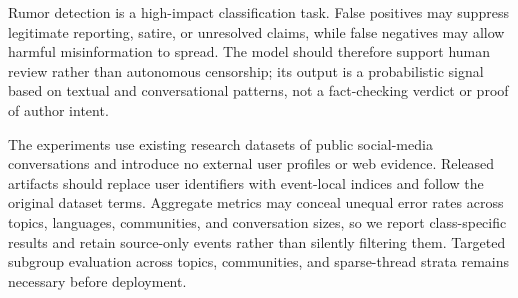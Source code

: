 \documentclass[sigconf,anonymous,review]{../acmart/acmart}
\begin{document}
Rumor detection is a high-impact classification task.  False positives may
suppress legitimate reporting, satire, or unresolved claims, while false
negatives may allow harmful misinformation to spread.  The model should
therefore support human review rather than autonomous censorship; its output
is a probabilistic signal based on textual and conversational patterns, not a
fact-checking verdict or proof of author intent.

The experiments use existing research datasets of public social-media
conversations and introduce no external user profiles or web evidence.
Released artifacts should replace user identifiers with event-local indices
and follow the original dataset terms.  Aggregate metrics may conceal unequal
error rates across topics, languages, communities, and conversation sizes, so
we report class-specific results and retain source-only events rather than
silently filtering them.  Targeted subgroup evaluation across topics,
communities, and sparse-thread strata remains necessary before deployment.



\end{document}
